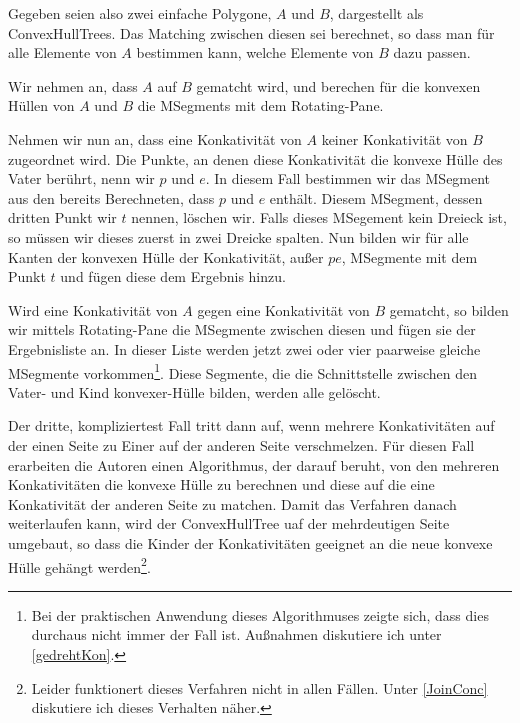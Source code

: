 Gegeben seien also zwei einfache Polygone, $A$ und $B$, dargestellt als ConvexHullTrees. Das Matching zwischen diesen sei berechnet, so dass man für alle Elemente von $A$ bestimmen kann, welche Elemente von $B$ dazu passen.

Wir nehmen an, dass $A$ auf $B$ gematcht wird, und berechen für die konvexen Hüllen von $A$ und $B$ die MSegments mit dem  Rotating-Pane. 

Nehmen wir nun an, dass eine Konkativität von $A$ keiner Konkativität von $B$ zugeordnet wird. Die Punkte, an denen diese Konkativität die konvexe Hülle des Vater berührt, nenn wir $p$ und $e$. In diesem Fall bestimmen wir das MSegment aus den bereits Berechneten, dass $p$ und $e$ enthält. Diesem MSegment, dessen dritten Punkt wir $t$ nennen, löschen wir. Falls dieses MSegement kein Dreieck ist, so müssen wir dieses zuerst in zwei Dreicke spalten. Nun bilden wir für alle Kanten der konvexen Hülle der Konkativität, außer $pe$, MSegmente mit dem Punkt $t$ und fügen diese dem Ergebnis hinzu.

Wird eine Konkativität von $A$ gegen eine Konkativität von $B$ gematcht, so bilden wir mittels Rotating-Pane die MSegmente zwischen diesen und fügen sie der Ergebnisliste an. In dieser Liste werden jetzt zwei oder vier paarweise gleiche MSegmente vorkommen\footnote{Bei der praktischen Anwendung dieses Algorithmuses zeigte sich, dass dies durchaus nicht immer der Fall ist. Außnahmen diskutiere ich unter \ref{gedrehtKon}.}. Diese Segmente, die die Schnittstelle zwischen den Vater- und Kind konvexer-Hülle bilden, werden alle gelöscht. 

Der dritte, kompliziertest Fall tritt dann auf, wenn mehrere Konkativitäten auf der einen Seite zu Einer auf der anderen Seite verschmelzen. Für diesen Fall erarbeiten die Autoren einen Algorithmus, der darauf beruht, von den mehreren Konkativitäten die konvexe Hülle zu berechnen und diese auf die eine Konkativität der anderen Seite zu matchen. Damit das Verfahren danach weiterlaufen kann, wird der ConvexHullTree uaf der mehrdeutigen Seite umgebaut, so dass die Kinder der Konkativitäten geeignet an die neue konvexe Hülle gehängt werden\footnote{Leider funktionert dieses Verfahren nicht in allen Fällen. Unter \ref{JoinConc} diskutiere ich dieses Verhalten näher.}.

